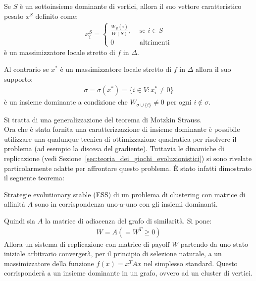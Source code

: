 \begin{thm}
	Se $S$ è un sottoinsieme dominante di vertici, allora il suo vettore caratteristico pesato $x^S$ definito come:
	\begin{align*}
		x^S_i = 
		\begin{cases}
			\frac{W_S(i)}{W(S)}, &\text{ se }i \in S\\
			0 &\text{ altrimenti}
		\end{cases}
	\end{align*}
	è un massimizzatore locale stretto di $f$ in $\Delta$.
	
	Al contrario se $x^*$ è un massimizzatore locale stretto di $f$ in $\Delta$ allora il suo supporto:
	\begin{align*}
		\sigma = \sigma(x^*) = \{ i \in V : x^*_i \neq 0 \}
	\end{align*}
	è un insieme dominante a condizione che $W_{\sigma \cup \{i\}} \neq 0$ per ogni $i \not\in \sigma$. 
\end{thm}

Si tratta di una generalizzazione del teorema di Motzkin Strauss.\\

Ora che è stata fornita una caratterizzazione di insieme dominante è possibile utilizzare una qualunque tecnica di ottimizzazione quadratica per risolvere il problema (ad esempio la discesa del gradiente). Tuttavia le dinamiche di replicazione (vedi Sezione~\ref{sec:teoria_dei_giochi_evoluzionistici}) si sono rivelate particolarmente adatte per affrontare questo problema. È stato infatti dimostrato il seguente teorema:

\begin{thm}
	Strategie evolutionary stable (ESS) di un problema di clustering con matrice di affinità $A$ sono in corrispondenza uno-a-uno con gli insiemi dominanti.
\end{thm}

\newpage

Quindi sia $A$ la matrice di adiacenza del grafo di similarità. Si pone:
\begin{align*}
	W = A (= W^T \geq 0)
\end{align*}
Allora un sistema di replicazione con matrice di payoff $W$ partendo da uno stato iniziale arbitrario convergerà, per il principio di selezione naturale, a un massimizzatore della funzione $f(x) = x^T A x$ nel simplesso standard. Questo corrisponderà a un insieme dominante in un grafo, ovvero ad un cluster di vertici.\\

